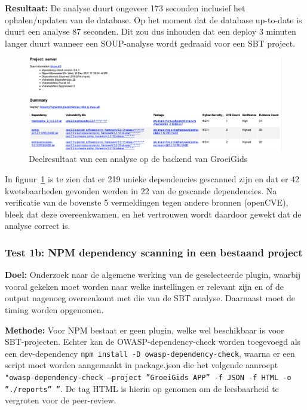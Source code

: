 \begin{itemize}
    \textbf{Resultaat:} De analyse duurt ongeveer 173 seconden inclusief het ophalen/updaten van de database. Op het moment dat de database up-to-date is duurt een analyse 87 seconden. Dit zou dus inhouden dat een deploy 3 minuten langer duurt wanneer een SOUP-analyse wordt gedraaid voor een SBT project.
    \begin{figure}
        \myfloatalign
        \includegraphics[width=15cm]{gfx/report_analyse_test1a_SBT}
        \caption{Deelresultaat van een analyse op de backend van GroeiGids}
        \label{fig:SBTReport1A}
    \end{figure}

    In figuur~\ref{fig:SBTReport1A} is te zien dat er 219 unieke dependencies gescanned zijn en dat er 42 kwetsbaarheden gevonden werden in 22 van de gescande dependencies. Na verificatie van de bovenste 5 vermeldingen tegen andere bronnen (openCVE), bleek dat deze overeenkwamen, en het vertrouwen wordt daardoor gewekt dat de analyse correct is.

    \subsubsection{Test 1b: NPM dependency scanning in een bestaand project}

    \textbf{Doel:} Onderzoek naar de algemene werking van de geselecteerde plugin, waarbij vooral gekeken moet worden naar welke instellingen er relevant zijn en of de output nagenoeg overeenkomt met die van de SBT analyse. Daarnaast moet de timing worden opgenomen.

    \textbf{Methode:} Voor NPM bestaat er geen plugin, welke wel beschikbaar is voor SBT-projecten. Echter kan de OWASP-dependency-check worden toegevoegd als een dev-dependency \texttt{npm install -D owasp-dependency-check}, waarna er een script moet worden aangemaakt in package.json die het volgende aanroept \texttt{"owasp-dependency-check --project ''GroeiGids APP'' -f JSON -f HTML -o ''./reports'' ''}. De tag HTML is hierin op genomen om de leesbaarheid te vergroten voor de peer-review.


\end{itemize}
